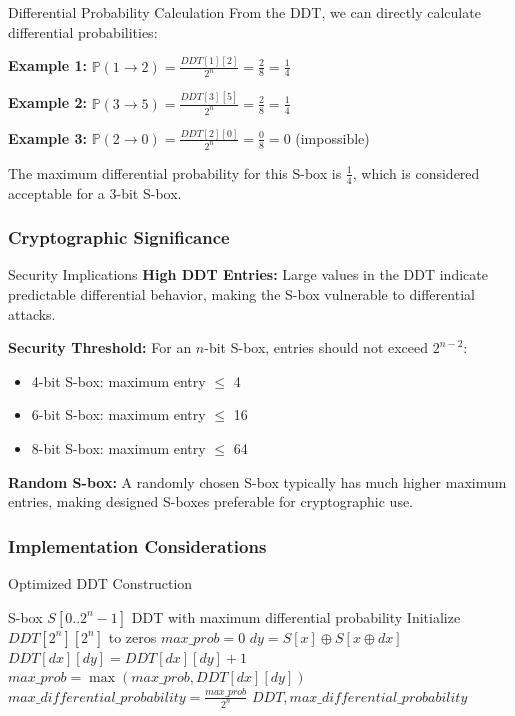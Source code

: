 \documentclass[12pt,a4paper]{article}
\theoremstyle{definition}
\newcommand{\prob}{\mathbb{P}}
\begin{document}
\begin{examplebox}{Differential Probability Calculation}
From the DDT, we can directly calculate differential probabilities:

\textbf{Example 1:} $\prob(1 \rightarrow 2) = \frac{DDT[1][2]}{2^n} = \frac{2}{8} = \frac{1}{4}$

\textbf{Example 2:} $\prob(3 \rightarrow 5) = \frac{DDT[3][5]}{2^n} = \frac{2}{8} = \frac{1}{4}$

\textbf{Example 3:} $\prob(2 \rightarrow 0) = \frac{DDT[2][0]}{2^n} = \frac{0}{8} = 0$ (impossible)

The maximum differential probability for this S-box is $\frac{1}{4}$, which is considered acceptable for a 3-bit S-box.
\end{examplebox}

\subsubsection{Cryptographic Significance}

\begin{warningbox}{Security Implications}
\textbf{High DDT Entries:} Large values in the DDT indicate predictable differential behavior, making the S-box vulnerable to differential attacks.

\textbf{Security Threshold:} For an $n$-bit S-box, entries should not exceed $2^{n-2}$:
\begin{itemize}
    \item 4-bit S-box: maximum entry $\leq$ 4
    \item 6-bit S-box: maximum entry $\leq$ 16  
    \item 8-bit S-box: maximum entry $\leq$ 64
\end{itemize}

\textbf{Random S-box:} A randomly chosen S-box typically has much higher maximum entries, making designed S-boxes preferable for cryptographic use.
\end{warningbox}

\subsubsection{Implementation Considerations}

\begin{algorithmbox}{Optimized DDT Construction}
\begin{algorithmic}[1]
\REQUIRE S-box $S[0..2^n-1]$
\ENSURE DDT with maximum differential probability
\STATE Initialize $DDT[2^n][2^n]$ to zeros
\STATE $max\_prob = 0$
 
        \STATE $dy = S[x] \oplus S[x \oplus dx]$
        \STATE $DDT[dx][dy] = DDT[dx][dy] + 1$
        \STATE $max\_prob = \max(max\_prob, DDT[dx][dy])$
    \ENDFOR
\ENDFOR
\STATE $max\_differential\_probability = \frac{max\_prob}{2^n}$
\RETURN $DDT, max\_differential\_probability$
\end{algorithmic}
\end{algorithmbox}
\end{document}

